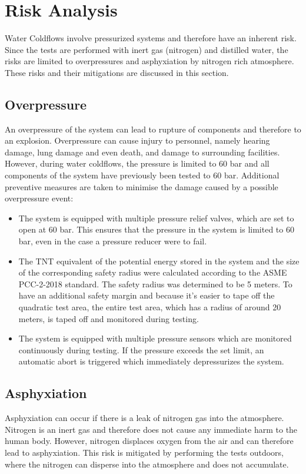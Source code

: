 \documentclass{article}
\begin{document}
\section{Risk Analysis}
Water Coldflows involve pressurized systems and therefore have an inherent risk. Since the tests are performed with inert gas (nitrogen) and distilled water, the risks are limited to overpressures and asphyxiation by nitrogen rich atmosphere. These risks and their mitigations are discussed in this section.
\subsection{Overpressure}
An overpressure of the system can lead to rupture of components and therefore to an explosion. Overpressure can cause injury to personnel, namely hearing damage, lung damage and even death, and damage to surrounding facilities. However, during water coldflows, the pressure is limited to 60 bar and all components of the system have previously been tested to 60 bar. Additional preventive measures are taken to minimise the damage caused by a possible overpressure event:
\begin{itemize}
    \item The system is equipped with multiple pressure relief valves, which are set to open at 60 bar. This ensures that the pressure in the system is limited to 60 bar, even in the case a pressure reducer were to fail.
    \item The TNT equivalent of the potential energy stored in the system and the size of the corresponding safety radius were calculated according to the ASME PCC-2-2018 standard. The safety radius was determined to be 5 meters. To have an additional safety margin and because it's easier to tape off the quadratic test area, the entire test area, which has a radius of around 20 meters, is taped off and monitored during testing.
    \item The system is equipped with multiple pressure sensors which are monitored continuously during testing. If the pressure exceeds the set limit, an automatic abort is triggered which immediately depressurizes the system.
\end{itemize}
\subsection{Asphyxiation}
Asphyxiation can occur if there is a leak of nitrogen gas into the atmosphere. Nitrogen is an inert gas and therefore does not cause any immediate harm to the human body. However, nitrogen displaces oxygen from the air and can therefore lead to asphyxiation. This risk is mitigated by performing the tests outdoors, where the nitrogen can disperse into the atmosphere and does not accumulate.
\end{document}
